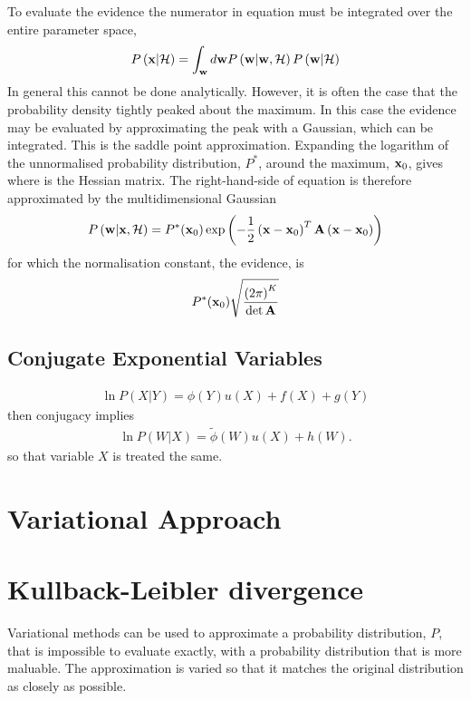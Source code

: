 {To evaluate the evidence the numerator in equation  must be integrated over the entire parameter space,
\begin{align}
  P\left( \mathbf{x}|{\cal H} \right) = \int_{\mathbf{w}} d\mathbf{w} P\left( \mathbf{w}|\mathbf{w},{\cal H} \right) P\left( \mathbf{w}|{\cal H} \right)
\end{align}
In general this cannot be done analytically.
However, it is often the case that the probability density tightly peaked about the maximum.
In this case the evidence may be evaluated by approximating the peak with a Gaussian, which can be integrated.
This is the saddle point approximation.
Expanding the logarithm of the  unnormalised probability distribution, $P^\ast$, 
around the maximum, $\mathbf{x}_0$,
gives
where 
is the Hessian matrix.
The right-hand-side of equation   is therefore approximated by the multidimensional Gaussian
\begin{align}
   P\left( \mathbf{w}|\mathbf{x},{\cal H} \right) = P^\ast(\mathbf{x}_0) \exp \left( - \frac{1}{2}\left( \mathbf{x}-\mathbf{x}_0 \right)^T \textbf{A}\left( \mathbf{x}-\mathbf{x}_0  \right) \right)
\end{align}
for which the normalisation constant, the evidence, is 
\begin{align}
   P^\ast(\mathbf{x}_0) \sqrt{\frac{\left( 2\pi \right)^K}{\det \textbf{A}}}
\end{align}


\subsection{Conjugate Exponential Variables}
\begin{align}
\ln P(X|Y) = \phi(Y) u(X) + f(X) + g(Y)
\end{align}
then conjugacy implies
\begin{align}
\ln P(W|X) = \tilde\phi(W) u(X) + h(W).
\end{align}
so that variable $X$ is treated the same.

\section{Variational Approach}

\section{Kullback-Leibler divergence}

Variational methods can be used to approximate a probability distribution, $P$, that is impossible to evaluate exactly, 
with a probability distribution that is more maluable.
The approximation is varied so that it matches the original distribution as closely as possible. 


}
